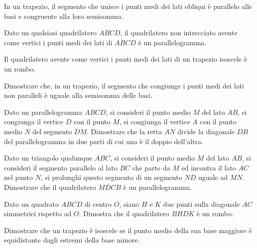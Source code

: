 \begin{multicols}{2}
\begin{esercizio}
\label{ese:4.35}
In un trapezio, il segmento che unisce i punti medi dei lati obliqui 
è parallelo alle basi e congruente alla loro semisomma.
\end{esercizio}

\begin{esercizio}
\label{ese:4.36}
Dato un qualsiasi quadrilatero \(ABCD\), il quadrilatero non 
intrecciato avente come vertici i punti medi dei lati di \(ABCD\) è un 
parallelogramma.
\end{esercizio}

\begin{esercizio}
\label{ese:4.37}
Il quadrilatero avente come vertici i punti medi dei lati di un 
trapezio isoscele è un rombo.
\end{esercizio}

\begin{esercizio}
\label{ese:4.38}
Dimostrare che, in un trapezio, il segmento che congiunge i punti 
medi dei lati non paralleli è uguale alla semisomma delle basi.
\end{esercizio}

\begin{esercizio}
\label{ese:4.39}
Dato un parallelogramma \(ABCD\), si consideri il punto medio \(M\) del 
lato \(AB\), si congiunga il vertice \(D\) con il punto \(M\), si congiunga 
il vertice \(A\) con il punto medio \(N\) del segmento \(DM\). Dimostrare 
che la retta \(AN\) divide la diagonale \(DB\) del parallelogramma in due 
parti di cui una è il doppio dell'altra.
\end{esercizio}

\begin{esercizio}
\label{ese:4.40}
Dato un triangolo qualunque \(ABC\), si consideri il punto medio \(M\) 
del lato \(AB\), si consideri il segmento parallelo al lato \(BC\) che 
parte da \(M\) ed incontra il lato \(AC\) nel punto \(N\), si prolunghi 
questo segmento di un segmento \(ND\) uguale ad \(MN\). Dimostrare che il 
quadrilatero \(MDCB\) è un parallelogramma.
\end{esercizio}

\begin{esercizio}
\label{ese:4.41}
Dato un quadrato \(ABCD\) di centro \(O\), siano \(H\) e \(K\) due punti 
sulla diagonale \(AC\) simmetrici rispetto ad \(O\). Dimostra che il 
quadrilatero \(BHDK\) è un rombo. 
\end{esercizio}

\begin{esercizio}
\label{ese:4.42}
Dimostrare che un trapezio è isoscele se il punto medio della sua 
base maggiore è equidistante dagli estremi della base minore.
\end{esercizio}


\end{multicols}
